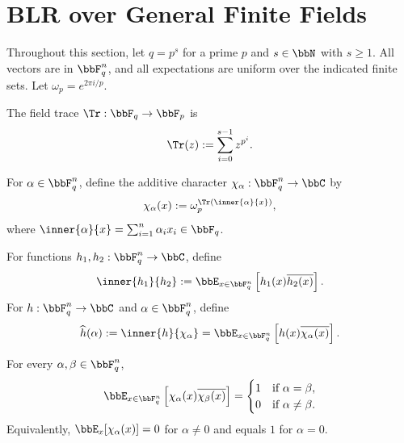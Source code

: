 \section{BLR over General Finite Fields}
\label{sec:blr-general-finite-fields}

Throughout this section, let $q=p^s$ for a prime $p$ and $s\in\bbN$ with $s\ge 1$.
All vectors are in $\bbF_q^n$, and all expectations are uniform over the indicated finite sets.
Let $\omega_p = e^{2\pi i/p}$.

\begin{definition}
\label{def:field-trace}
The field trace $\Tr: \bbF_q \to \bbF_p$ is
\[
    \Tr(z) := \sum_{i=0}^{s-1} z^{p^i}.
\]
\end{definition}

\begin{definition}
\label{def:additive-character}
For $\alpha\in\bbF_q^n$, define the additive character
$\chi_\alpha: \bbF_q^n\to\bbC$ by
\[
    \chi_\alpha(x) := \omega_p^{\Tr(\inner{\alpha}{x})},
\]
where $\inner{\alpha}{x}=\sum_{i=1}^n \alpha_i x_i\in\bbF_q$.
\end{definition}

\begin{definition}
\label{def:fourier-coefficient}
For functions $h_1,h_2:\bbF_q^n\to\bbC$, define
\[
    \inner{h_1}{h_2}
    := \bbE_{x\in\bbF_q^n}\left[h_1(x)\overline{h_2(x)}\right].
\]
For $h:\bbF_q^n\to\bbC$ and $\alpha\in\bbF_q^n$, define
\[
    \widehat h(\alpha)
    := \inner{h}{\chi_\alpha}
    = \bbE_{x\in\bbF_q^n}\left[h(x)\overline{\chi_\alpha(x)}\right].
\]
\end{definition}

\begin{lemma}
\label{lem:character-orthogonality}
For every $\alpha,\beta\in\bbF_q^n$,
\[
    \bbE_{x\in\bbF_q^n}\left[\chi_\alpha(x)\overline{\chi_\beta(x)}\right]
    =
    \begin{cases}
        1 & \text{if } \alpha=\beta,\\
        0 & \text{if } \alpha\ne\beta.
    \end{cases}
\]
Equivalently, $\bbE_x[\chi_\alpha(x)]=0$ for $\alpha\ne 0$ and equals $1$ for $\alpha=0$.
\end{lemma}


